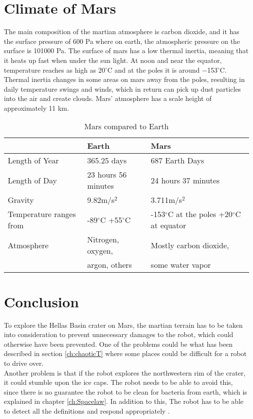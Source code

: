 \section{Climate of Mars}
The main composition of the martian atmosphere is carbon dioxide, and it has the surface pressure of 600 Pa where on earth, the atmospheric pressure on the surface is 101000 Pa.
\newline The surface of mars has a low thermal inertia, meaning that it heats up fast when under the sun light. At noon and near the equator, temperature reaches as high as 20$^{\circ}$C and at the poles it is around −153$^{\circ}$C. Thermal inertia changes in some areas on mars away from the poles, resulting in daily temperature swings and winds, which in return can pick up dust particles into the air and create clouds. Mars' atmosphere has a scale height of approximately 11 km\cite{climate}.
\begin{table} [h]
    \centering
    \begin{tabu} to 1\textwidth { | X[c] X[c] X[c] | }
     \hline
      & Earth & Mars \\ 
     \hline
     Length of Year & 365.25 days & 687 Earth Days \\
     \hline
     Length of Day & 23 hours 56 minutes & 24 hours 37 minutes \\
     \hline
     Gravity & 9.82m/s$^2$ & 3.711m/s$^2$ \\
     \hline
     Temperature ranges from & -89$^{\circ}$C +55$^{\circ}$C &-153$^{\circ}$C at the poles +20$^{\circ}$C at equator \\
     \hline
     Atmosphere & Nitrogen, oxygen, & Mostly carbon dioxide, \\
      & argon, others & some water vapor \\
     \hline
    \end{tabu}
    \caption{Mars compared to Earth\cite{MarsVSEarth}}
    \label{tab:marsEarthFacts}
\end{table}

\newpage

\section{Conclusion}
To explore the Hellas Basin crater on Mars, the martian terrain has to be taken into consideration to prevent unnecessary damages to the robot, which could otherwise have been prevented.
One of the problems could be what has been described in section \ref{ch:chaoticT} where some places could be difficult for a robot to drive over.\\
Another problem is that if the robot explores the northwestern rim of the crater, it could stumble upon the ice caps. The robot needs to be able to avoid this, since there is no guarantee the robot to be clean for bacteria from earth, which is explained in chapter \ref{ch:Spacelaw}. In addition to this, The robot has to be able to detect all the definitions and respond appropriately \cite{AspectsWeather}.


